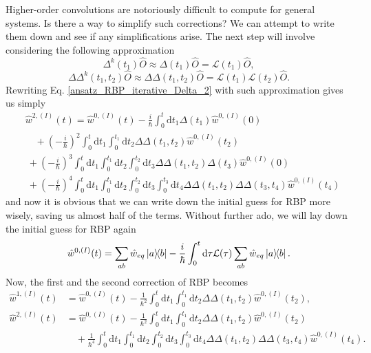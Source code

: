 Higher-order convolutions are notoriously difficult to compute for general systems. Is there a way to simplify such corrections? We can attempt to write them down and see if any simplifications arise. The next step will involve considering the following approximation
\begin{equation}
\label{Delta_1_approximation}
    \Delta^{k}(t_1) \hat{O} \approx \Delta(t_1) \hat{O}= \mathcal{L}(t_1) \hat{O},
\end{equation}
\begin{equation}
\label{Delta_2_approximation}
    \Delta\Delta^{k}(t_1, t_2) \hat{O} \approx \Delta\Delta(t_1, t_2) \hat{O} = \mathcal{L}(t_1) \mathcal{L}(t_2) \hat{O} .
\end{equation}
Rewriting Eq. \ref{ansatz_RBP_iterative_Delta_2} with such approximation gives us simply
\begin{equation}
\label{ansatz_RBP_iterative_Delta_2_simple}
    \begin{aligned}
    &\hat{w}^{2,(I)}(t) = \hat{w}^{0, (I)}(t) - \frac{i}{\hbar}\int_{0}^{t} \mathrm{d} t_1 \Delta(t_1) \hat{w}^{0, (I)}(0) \\
     &\quad +\left(-\frac{i}{\hbar}\right)^2 \int_{0}^{t} \mathrm{d} t_1 \int_{0}^{t_1} \mathrm{d} t_2 \Delta\Delta(t_1, t_2) \hat{w}^{0, (I)}(t_2) \\
     &\: +\left(-\frac{i}{\hbar}\right)^3 \int_{0}^{t} \mathrm{d} t_1 \int_{0}^{t_1} \mathrm{d} t_2 \int_{0}^{t_2} \mathrm{d} t_3 \Delta\Delta(t_1, t_2) \Delta(t_3) \hat{w}^{0, (I)}(0) \\
     &\: +\left(-\frac{i}{\hbar}\right)^4 \int_{0}^{t} \mathrm{d} t_1 \int_{0}^{t_1} \mathrm{d} t_2 \int_{0}^{t_2} \mathrm{d} t_3 \int_{0}^{t_3} \mathrm{d} t_4 \Delta\Delta(t_1, t_2) \Delta\Delta(t_3, t_4) \hat{w}^{0, (I)}(t_4)
    \end{aligned}
\end{equation}
and now it is obvious that we can write down the initial guess for RBP more wisely, saving us almost half of the terms. Without further ado, we will lay down the initial guess for RBP again
\begin{equation}
\label{w_0_second_try}
    \hat{w}^{0, (I)}(t) = \sum_{ab} \hat{w}_{eq} \ketbra{a}{b} - \frac{i}{\hbar}\int_{0}^{t} \mathrm{d} \tau \mathcal{L}(\tau) \sum_{ab} \hat{w}_{eq} \ketbra{a}{b}.
\end{equation}
Now, the first and the second correction of RBP becomes
\begin{equation}
\label{ansatz_RBP_iterative_Delta_without_k}
    \begin{aligned}
    \hat{w}^{1,(I)}(t) &= \hat{w}^{0, (I)}(t) - \frac{1}{\hbar^2} \int_{0}^{t} \mathrm{d} t_1 \int_{0}^{t_1} \mathrm{d} t_2 \Delta\Delta(t_1, t_2) \hat{w}^{0, (I)}(t_2), \\
    \hat{w}^{2,(I)}(t) &= \hat{w}^{0, (I)}(t) - \frac{1}{\hbar^2} \int_{0}^{t} \mathrm{d} t_1 \int_{0}^{t_1} \mathrm{d} t_2 \Delta\Delta(t_1, t_2) \hat{w}^{0, (I)}(t_2) \\
    &\quad + \frac{1}{\hbar^4} \int_{0}^{t} \mathrm{d} t_1 \int_{0}^{t_1} \mathrm{d} t_2 \int_{0}^{t_2} \mathrm{d} t_3 \int_{0}^{t_3} \mathrm{d} t_4 \Delta\Delta(t_1, t_2) \Delta\Delta(t_3, t_4) \hat{w}^{0, (I)}(t_4).
    \end{aligned}
\end{equation}
